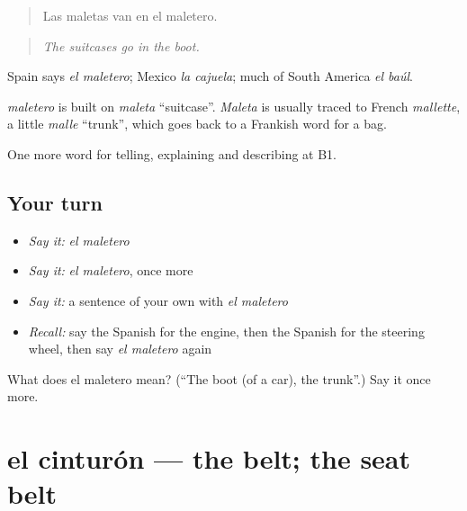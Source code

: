 \begin{quote}
Las maletas van en el maletero.
\end{quote}

\begin{quote}
\emph{The suitcases go in the boot.}
\end{quote}

Spain says \emph{el maletero}; Mexico \emph{la cajuela}; much of South America \emph{el baúl}.

\begin{cousinweb}
\emph{maletero} is built on \emph{maleta} \textquotedblleft{}suitcase\textquotedblright{}. \emph{Maleta} is usually traced to French \emph{mallette}, a little \emph{malle} \textquotedblleft{}trunk\textquotedblright{}, which goes back to a Frankish word for a bag.
\end{cousinweb}

\begin{grammarlens}[title={What you've built}]
One more word for telling, explaining and describing at B1.
\end{grammarlens}

\subsection*{Your turn}
\begin{itemize}
\raggedright
  \item \emph{Say it:} \emph{el maletero}
  \item \emph{Say it:} \emph{el maletero}, once more
  \item \emph{Say it:} a sentence of your own with \emph{el maletero}
  \item \emph{Recall:} say the Spanish for the engine, then the Spanish for the steering wheel, then say \emph{el maletero} again
\end{itemize}

\begin{tcolorbox}[breakable,colback=teal!4,colframe=teal!35!black,title={Before you move on}]
What does el maletero mean? (\textquotedblleft{}The boot (of a car), the trunk\textquotedblright{}.) Say it once more.
\end{tcolorbox}
\section[el cinturón]{el cinturón — the belt; the seat belt}

\label{lesson:ES-C644-cinturon}



